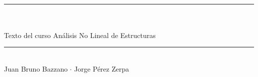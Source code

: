 \documentclass[spanish,twoside,openright,10pt]{book}
\theoremstyle{miestilo}
\begin{document}
\frontmatter

%






\begin{titlepage}

~
\vspace{2cm}


  \noindent
\textcolor{miblue}{        \rule{\linewidth}{0.4mm}} \\[0.2cm]
  \\[0.3cm]
                {\large\sffamily Texto del curso Análisis No Lineal de Estructuras}\\
\textcolor{miblue}{\rule{\linewidth}{.4mm}} \\[0.2cm]
{\Large\sffamily  Juan Bruno Bazzano  $\cdot$ Jorge Pérez Zerpa}\\[0.4cm]






\end{titlepage}
\end{document}
